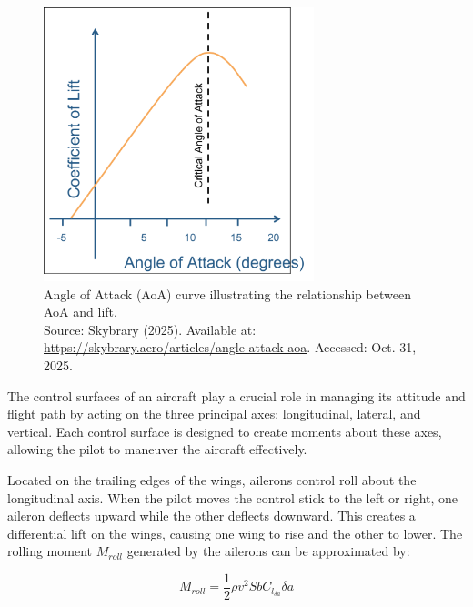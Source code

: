 \begin{figure}[H]
    \centering
    \includegraphics[width=0.7\textwidth]{figures/angle_of_attack_curve.png}
    \caption{Angle of Attack (AoA) curve illustrating the relationship between AoA and lift. \\ Source: Skybrary (2025). Available at: \url{https://skybrary.aero/articles/angle-attack-aoa}. Accessed: Oct. 31, 2025.}
    \label{fig:angle_of_attack_curve}
\end{figure}


The control surfaces of an aircraft play a crucial role in managing its attitude and flight path by acting on the three principal axes: longitudinal, lateral, and vertical. Each control surface is designed to create moments about these axes, allowing the pilot to maneuver the aircraft effectively.

Located on the trailing edges of the wings, ailerons control roll about the longitudinal axis. When the pilot moves the control stick to the left or right, one aileron deflects upward while the other deflects downward. This creates a differential lift on the wings, causing one wing to rise and the other to lower. The rolling moment $M_{roll}$ generated by the ailerons can be approximated by:

\begin{equation}
    M_{roll} = \frac{1}{2} \rho v^2 S b C_{l_{\delta a}} \delta a
\end{equation}

